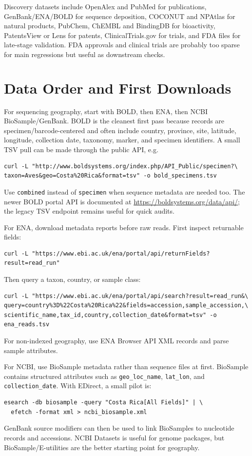 \documentclass[10pt]{article}
\begin{document}
Discovery datasets include OpenAlex and PubMed for publications, GenBank/ENA/BOLD for sequence deposition, COCONUT and NPAtlas for natural products, PubChem, ChEMBL and BindingDB for bioactivity, PatentsView or Lens for patents, ClinicalTrials.gov for trials, and FDA files for late-stage validation. FDA approvals and clinical trials are probably too sparse for main regressions but useful as downstream checks.

\section*{Data Order and First Downloads}

For sequencing geography, start with BOLD, then ENA, then NCBI BioSample/GenBank. BOLD is the cleanest first pass because records are specimen/barcode-centered and often include country, province, site, latitude, longitude, collection date, taxonomy, marker, and specimen identifiers. A small TSV pull can be made through the public API, e.g.
\begin{verbatim}
curl -L "http://www.boldsystems.org/index.php/API_Public/specimen?\
taxon=Aves&geo=Costa%20Rica&format=tsv" -o bold_specimens.tsv
\end{verbatim}
Use \texttt{combined} instead of \texttt{specimen} when sequence metadata are needed too. The newer BOLD portal API is documented at \url{https://boldsystems.org/data/api/}; the legacy TSV endpoint remains useful for quick audits.

For ENA, download metadata reports before raw reads. First inspect returnable fields:
\begin{verbatim}
curl -L "https://www.ebi.ac.uk/ena/portal/api/returnFields?result=read_run"
\end{verbatim}
Then query a taxon, country, or sample class:
\begin{verbatim}
curl -L "https://www.ebi.ac.uk/ena/portal/api/search?result=read_run&\
query=country%3D%22Costa%20Rica%22&fields=accession,sample_accession,\
scientific_name,tax_id,country,collection_date&format=tsv" -o ena_reads.tsv
\end{verbatim}
For non-indexed geography, use ENA Browser API XML records and parse sample attributes.

For NCBI, use BioSample metadata rather than sequence files at first. BioSample contains structured attributes such as \texttt{geo\_loc\_name}, \texttt{lat\_lon}, and \texttt{collection\_date}. With EDirect, a small pilot is:
\begin{verbatim}
esearch -db biosample -query "Costa Rica[All Fields]" | \
  efetch -format xml > ncbi_biosample.xml
\end{verbatim}
GenBank source modifiers can then be used to link BioSamples to nucleotide records and accessions. NCBI Datasets is useful for genome packages, but BioSample/E-utilities are the better starting point for geography.
\end{document}
